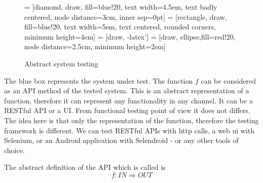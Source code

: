 \documentclass[conference]{IEEEtran}
\begin{document}
\begin{figure}[hbt!]
    \caption{Abstract system testing}
    \centering
    \label{fig.absSysTest}
  
     = [diamond, draw, fill=blue!20, text width=4.5em, text badly centered, node distance=3cm, inner sep=0pt]
     = [rectangle, draw, fill=blue!20, text width=5em, text centered, rounded corners, minimum height=4em]
     = [draw, -latex']
     = [draw, ellipse,fill=red!20, node distance=2.5cm, minimum height=2em]
    
\end{figure}

The blue box represents the system under test. The function \(f\) can be considered as an API method of the tested system. This is an abstract representation of a function, therefore it can represent any functionality in any channel. It can be a RESTful API or a UI. From functional testing point of view it does not differs. The idea here is that only the representation of the function, therefore the testing framework is different. We can test RESTful APIs with http calls, a web ui with Selenium, or an Android application with Selendroid - or any other tools of choice. 

The abstract definition of the API which is called is 
\begin{equation} \label{eq.apiFn}
    f: IN \Rightarrow OUT
\end{equation}
\end{document}

